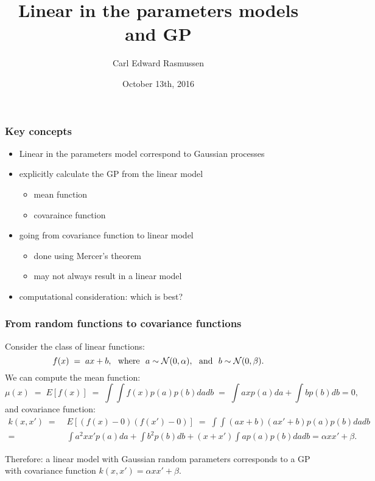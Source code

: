 

\title{Linear in the parameters models and GP}
\author{Carl Edward Rasmussen}
\date{October 13th, 2016}



\begin{frame}
\titlepage
\end{frame}

\begin{frame}
\frametitle{Key concepts}
\begin{itemize}
\item Linear in the parameters model correspond to Gaussian processes
\item explicitly calculate the GP from the linear model
\begin{itemize}
\item mean function
\item covaraince function
\end{itemize}
\item going from covariance function to linear model
\begin{itemize}
\item done using Mercer's theorem
\item may not always result in a  linear model
\end{itemize}
\item computational consideration: which is best?
\end{itemize}
\end{frame}

\begin{frame}
\frametitle{From random functions to covariance functions}

Consider the class of linear functions:
\[
f(x)\;=\;ax+b,\text{\ \ where\ \ }a\sim{\cal N}(0,\alpha),\text{\ \ and\ \ }
b\sim{\cal N}(0,\beta).
\]
We can compute the mean function:
\[
\mu(x)\;=\;E[f(x)]\;=\;\int\!\int f(x)p(a)p(b)dadb\;=\;
\int axp(a)da+\int bp(b)db=0,
\]
and covariance function:
\[
\begin{split}
k(x,x')\;=&\;E[(f(x)-0)(f(x')-0)]\;=\;\int\!\int
(ax+b)(ax'+b)p(a)p(b)dadb\\
=&\;\int a^2xx'p(a)da+\int b^2p(b)db+(x+x')\int ap(a)p(b)dadb
=\alpha xx'+\beta.
\end{split}
\]

Therefore: a linear model with Gaussian random parameters corresponds to a GP
with covariance function $k(x,x')=\alpha xx'+\beta$.
\end{frame}


